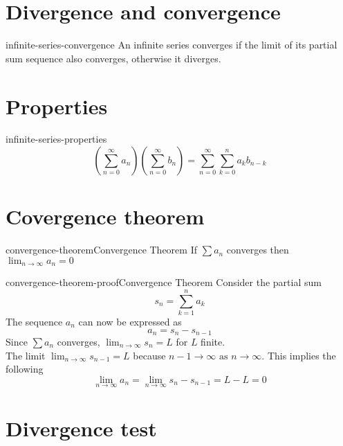\documentclass[preview]{standalone}
\begin{document}
\genpage

\section{Divergence and convergence}

\begin{snippet}{infinite-series-convergence}
An infinite series converges if the limit
of its partial sum sequence also converges,
otherwise it diverges.
\end{snippet}

\section{Properties}

\begin{snippettheorem}{infinite-series-properties}{}
    \[
        \left(
            \sum_{n=0}^\infty a_n
        \right)
        \left(
            \sum_{n=0}^\infty b_n
        \right)
        =
        \sum_{n=0}^\infty \sum_{k=0}^n a_k b_{n-k}
    \]
\end{snippettheorem}

\section{Covergence theorem}

\begin{snippettheorem}{convergence-theorem}{Convergence Theorem}
    If \(\sum a_n\) converges then \(\lim_{n\to\infty}a_n=0\)
\end{snippettheorem}

\begin{snippetproof}{convergence-theorem-proof}{Convergence Theorem}
    Consider the partial sum
    \[
        s_n = \sum_{k=1}^{n}a_k
    \]
    The sequence \(a_n\) can now be expressed as
    \[
        a_n = s_n - s_{n-1}
    \]
    Since \(\sum a_n\) converges, \(\lim_{n\to\infty}s_n=L\) for \(L\) finite. \\
    The limit \(\lim_{n\to\infty}s_{n-1}=L\) because \(n-1 \to \infty \text{ as } n \to \infty\).
    This implies the following
    \[
        \lim_{n \to \infty} a_n
        = \lim_{n \to \infty} s_n - s_{n-1} = L - L = 0
    \]
\end{snippetproof}

\section{Divergence test}
\end{document}
